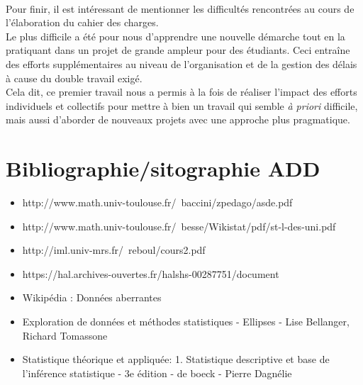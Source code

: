 		\paragraph{} Pour finir, il est intéressant de mentionner les difficultés rencontrées au cours de l'élaboration du cahier des charges.\\
		Le plus difficile a été pour nous d'apprendre une nouvelle démarche tout en la pratiquant dans un projet de grande ampleur pour des étudiants. Ceci entraîne des efforts supplémentaires au niveau de l'organisation et de la gestion des délais à cause du double travail exigé.\\
		Cela dit, ce premier travail nous a permis à la fois de réaliser l'impact des efforts individuels et collectifs pour mettre à bien un travail qui semble \textit{à priori} difficile, mais aussi d'aborder de nouveaux projets avec une approche plus pragmatique.\\
	
	\section*{Bibliographie/sitographie ADD}
	\begin{itemize}
		\item http://www.math.univ-toulouse.fr/~baccini/zpedago/asde.pdf
		\item http://www.math.univ-toulouse.fr/~besse/Wikistat/pdf/st-l-des-uni.pdf
		\item http://iml.univ-mrs.fr/~reboul/cours2.pdf
		\item https://hal.archives-ouvertes.fr/halshs-00287751/document
		\item Wikipédia : Données aberrantes
		\item Exploration de données et méthodes statistiques - Ellipses - Lise Bellanger, Richard Tomassone
		\item Statistique théorique et appliquée: 1. Statistique descriptive et base de l'inférence statistique - 3e édition - de boeck - Pierre Dagnélie
	\end{itemize}


